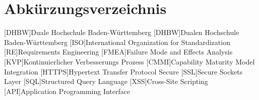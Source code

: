 \section*{Abkürzungsverzeichnis}
\begin{acronym}
  [DHBW]{Duale Hochschule Ba\-den-\-Würt\-tem\-berg}
  [DHBW]{Dualen Hochschule Ba\-den-\-Würt\-tem\-berg}
  [ISO]{International Organization for Standardization}
  [RE]{Requirements Engineering}
  [FMEA]{Failure Mode and Effects Analysis}
  [KVP]{Kontinuierlicher Verbesserungs Prozess}
  [CMMI]{Capability Maturity Model Integration}
  [HTTPS]{Hypertext Transfer Protocol Secure}
  [SSL]{Secure Sockets Layer}
  [SQL]{Structured Query Language}
  [XSS]{Cross-Site Scripting}
  [API]{Application Programming Interface}
\end{acronym}
\newpage